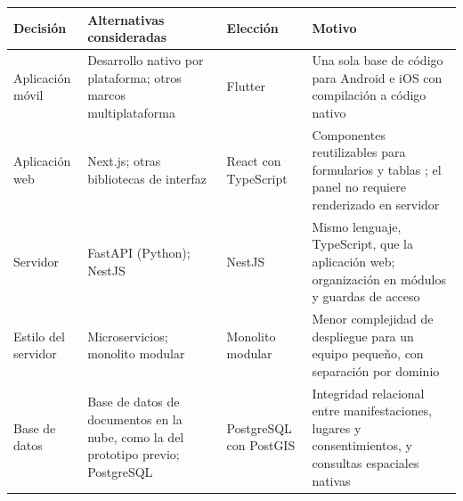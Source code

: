 {\centering\singlespacing
  \label{tab:justificacion}
  \begin{tabular}{|p{}|p{}|p{}|p{}|}
    \hline
    \textbf{Decisión} & \textbf{Alternativas consideradas} & \textbf{Elección} & \textbf{Motivo} \tabularnewline
    \hline
    \raggedright\hspace{0pt}Aplicación móvil & \raggedright\hspace{0pt}Desarrollo nativo por plataforma; otros marcos multiplataforma & \raggedright\hspace{0pt}Flutter & \raggedright\hspace{0pt}Una sola base de código para Android e iOS con compilación a código nativo \cite{flutter2026docs} \tabularnewline
    \hline
    \raggedright\hspace{0pt}Aplicación web & \raggedright\hspace{0pt}Next.js; otras bibliotecas de interfaz & \raggedright\hspace{0pt}React con TypeScript & \raggedright\hspace{0pt}Componentes reutilizables para formularios y tablas \cite{react2026docs}; el panel no requiere renderizado en servidor \tabularnewline
    \hline
    \raggedright\hspace{0pt}Servidor & \raggedright\hspace{0pt}FastAPI (Python); NestJS & \raggedright\hspace{0pt}NestJS & \raggedright\hspace{0pt}Mismo lenguaje, TypeScript, que la aplicación web; organización en módulos y guardas de acceso \cite{nestjs2026docs} \tabularnewline
    \hline
    \raggedright\hspace{0pt}Estilo del servidor & \raggedright\hspace{0pt}Microservicios; monolito modular & \raggedright\hspace{0pt}Monolito modular & \raggedright\hspace{0pt}Menor complejidad de despliegue para un equipo pequeño, con separación por dominio \cite{richards2020fundamentals} \tabularnewline
    \hline
    \raggedright\hspace{0pt}Base de datos & \raggedright\hspace{0pt}Base de datos de documentos en la nube, como la del prototipo previo; PostgreSQL & \raggedright\hspace{0pt}PostgreSQL con PostGIS & \raggedright\hspace{0pt}Integridad relacional entre manifestaciones, lugares y consentimientos, y consultas espaciales nativas \cite{postgis2026docs} \tabularnewline
    \hline
      \end{tabular}\par}

